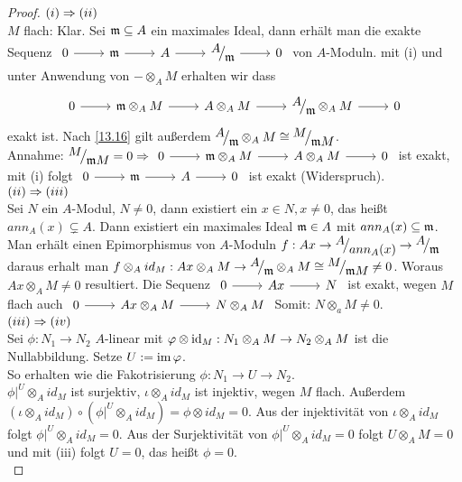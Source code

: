 \begin{proof}
	$(i) \Rightarrow (ii) $ \\
	$M$ flach: Klar. Sei $\mathfrak{m} \subseteq A $ ein maximales Ideal, dann erhält man die exakte Sequenz $\begin{tikzcd} 0 \arrow{r} & \m \arrow{r} & A \arrow{r} & \QR{A}{\m} \arrow{r} & 0 \end{tikzcd}$ von $A$-Moduln. mit (i) und unter Anwendung von $- \otimes_A M $ erhalten wir dass $$\begin{tikzcd} 0 \arrow{r} & \m \otimes_A M \arrow{r} & A \otimes_A M \arrow{r} & \QR{A}{\m} \otimes_A M \arrow{r} & 0 \end{tikzcd}$$ exakt ist. 
	Nach \ref{13.16} gilt außerdem $\QR{A}{\m} \otimes_A M \cong \QR{M}{\m M}$. \\
	Annahme: $\QR{M}{\m M} = 0 \Ra \begin{tikzcd} 0 \arrow{r} & \m \otimes_A M \arrow{r} & A \otimes_A M \arrow{r} & 0 \end{tikzcd}$ ist exakt, mit (i) folgt $\begin{tikzcd} 0 \arrow{r} & \m \arrow{r} & A \arrow{r} &  0 \end{tikzcd}$ ist exakt (Widerspruch).  \\
	$(ii) \Rightarrow (iii) $ \\
	 Sei $N$ ein $A$-Modul, $N \neq 0$, dann existiert ein $x \in N, x \neq 0$, das heißt $ann_A(x) \subsetneq A $. Dann existiert ein maximales Ideal $\mathfrak{m} \in A $  mit $ann_A(x) \subseteq \mathfrak{m} $. Man erhält einen Epimorphismus von $A$-Moduln $ f: Ax \to \QR{A}{ann_A(x)} \to \QR{A}{\m} $ daraus erhalt man $ f \otimes_A id_M: Ax \otimes_A M \to  \QR{A}{\m} \otimes_A M \cong \QR{M}{\m M } \neq 0$. Woraus $Ax \otimes_A M \neq 0 $ resultiert. Die Sequenz $\begin{tikzcd} 0 \arrow{r} & Ax \arrow{r} & N   \end{tikzcd}$ ist exakt, wegen $M$ flach auch $\begin{tikzcd} 0 \arrow{r} & Ax \otimes_A M  \arrow{r} & N \otimes_A M \end{tikzcd}$ Somit: $N \otimes_a M \neq 0 $. \\
	$(iii) \Rightarrow (iv) $ \\
	 Sei $\phi: N_1 \to N_2 $ $A$-linear mit $\varphi \otimes \operatorname{id}_M: N_1 \otimes_A M \to N_2 \otimes_A M $ ist die Nullabbildung. Setze $U := \operatorname{im} \varphi $. \\
	 So erhalten wie die Fakotrisierung $\phi: N_1 \to U \to N_2$.\\
	  $\phi|^{U} \otimes_A id_M $ ist surjektiv, $\iota \otimes_A id_M $ ist injektiv, wegen $M$ flach. Außerdem $(\iota \otimes_A id_M) \circ (\phi|^{U} \otimes_A id_M) = \phi \otimes id_M = 0$. Aus der injektivität von $\iota \otimes_A id_M $  folgt $\phi|^{U} \otimes_A id_M = 0 $. Aus der Surjektivität von $\phi|^{U} \otimes_A id_M = 0 $ folgt $U \otimes_A M =  0 $ und mit (iii) folgt $U = 0 $, das heißt $\phi = 0.$ \\

\end{proof}
